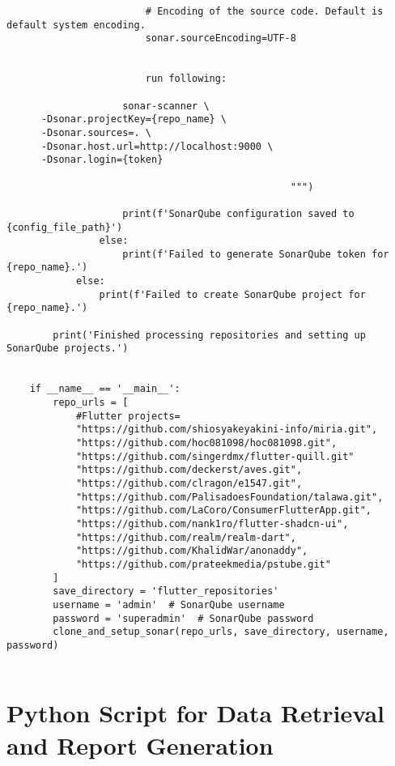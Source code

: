 \begin{lstlisting}
                        # Encoding of the source code. Default is default system encoding.
                        sonar.sourceEncoding=UTF-8
                        
                        
                        run following:
                        
                    sonar-scanner \
      -Dsonar.projectKey={repo_name} \
      -Dsonar.sources=. \
      -Dsonar.host.url=http://localhost:9000 \
      -Dsonar.login={token}
                        
                                                 """)
    
                    print(f'SonarQube configuration saved to {config_file_path}')
                else:
                    print(f'Failed to generate SonarQube token for {repo_name}.')
            else:
                print(f'Failed to create SonarQube project for {repo_name}.')
    
        print('Finished processing repositories and setting up SonarQube projects.')
    
    
    if __name__ == '__main__':
        repo_urls = [
            #Flutter projects=
            "https://github.com/shiosyakeyakini-info/miria.git",
            "https://github.com/hoc081098/hoc081098.git",
            "https://github.com/singerdmx/flutter-quill.git"
            "https://github.com/deckerst/aves.git",
            "https://github.com/clragon/e1547.git",
            "https://github.com/PalisadoesFoundation/talawa.git",
            "https://github.com/LaCoro/ConsumerFlutterApp.git",
            "https://github.com/nank1ro/flutter-shadcn-ui",
            "https://github.com/realm/realm-dart",
            "https://github.com/KhalidWar/anonaddy",
            "https://github.com/prateekmedia/pstube.git"
        ]
        save_directory = 'flutter_repositories'
        username = 'admin'  # SonarQube username
        password = 'superadmin'  # SonarQube password
        clone_and_setup_sonar(repo_urls, save_directory, username, password)
    
\end{lstlisting}
\section{Python Script for Data Retrieval and Report Generation} \label{app:a3}

